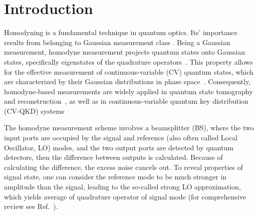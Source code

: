 \documentclass[]{article}
\begin{document}
\section{Introduction}
Homodyning is a fundamental technique in quantum optics.
Its' importance results from belonging to Gaussian measurement class \cite{weedbrook2012gaussian}. Being a Gaussian measurement, homodyne measurement projects quantum states onto Gaussian states, specifically eigenstates of the quadrature operators~\cite{braunstein1990homodyne}.%
This property allows for the effective measurement of continuous-variable (CV) quantum states, which are characterized by their Gaussian distributions in phase space~\cite{serafini2017quantum}.
Consequently, homodyne-based measurements are widely applied in
quantum state tomography~\cite{d2003quantum,OPATRNY1997112, PhysRevA.54.856, walker1986multiport} and reconstruction~\cite{welsch1999ii,PhysRevA.53.4528, Olivares_2019, PhysRevA.48.4598}, as well as in
continuous-variable quantum key distribution (CV-QKD) systems~\cite{PhysRevLett.88.057902,PhysRevLett.93.170504,RevModPhys.84.621,e17096072,opt3040030,10.1063/5.0179566}
%

The homodyne measurement scheme involves a beamsplitter (BS), where the two input ports are occupied by the signal and reference (also often called Local Oscillator, LO) modes, and the two output ports are detected by quantum detectors, then the difference between outputs is calculated. Because of calculating the difference, the excess noise cancels out.
To reveal properties of signal state, one can consider the reference mode to be much stronger in amplitude than the signal, leading to the so-called strong LO approximation, which yields  average of quadrature operator of signal mode (for comprehensive review see Ref.{~\cite{vogel2006quantum}}).
\end{document}

